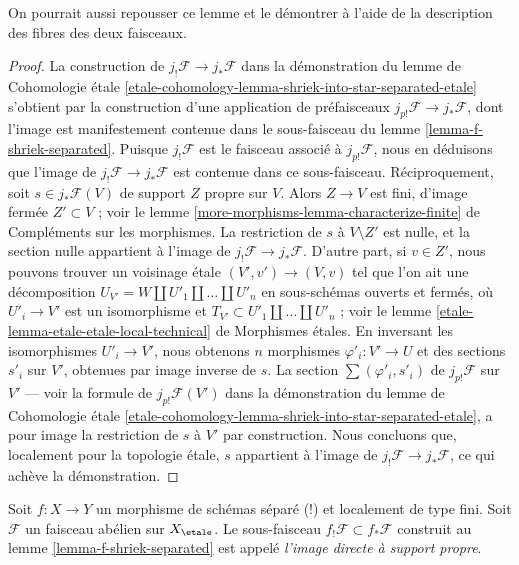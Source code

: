 \noindent
On pourrait aussi repousser ce lemme et le démontrer
à l'aide de la description des fibres des deux faisceaux.

\begin{proof}
La construction de $j_!\mathcal{F} \to j_*\mathcal{F}$ dans la démonstration du
lemme de Cohomologie étale
\ref{etale-cohomology-lemma-shriek-into-star-separated-etale}
s'obtient par la construction d'une application de préfaisceaux
$j_{p!}\mathcal{F} \to j_*\mathcal{F}$, dont l'image est manifestement
contenue dans le sous-faisceau du
lemme \ref{lemma-f-shriek-separated}.
Puisque $j_!\mathcal{F}$ est le faisceau associé à
$j_{p!}\mathcal{F}$, nous en déduisons que l'image de
$j_!\mathcal{F} \to j_*\mathcal{F}$ est contenue dans
ce sous-faisceau. Réciproquement, soit $s \in j_*\mathcal{F}(V)$
de support $Z$ propre sur $V$. Alors $Z \to V$ est
fini, d'image fermée $Z' \subset V$ ; voir le lemme
\ref{more-morphisms-lemma-characterize-finite} de Compléments sur les morphismes.
La restriction de $s$ à $V \setminus Z'$ est nulle, et la section nulle
appartient à l'image de $j_!\mathcal{F} \to j_*\mathcal{F}$.
D'autre part, si $v \in Z'$, nous pouvons trouver
un voisinage étale
$(V', v') \to (V, v)$ tel que l'on ait une décomposition
$U_{V'} = W \amalg U'_1 \amalg \ldots \amalg U'_n$
en sous-schémas ouverts et fermés, où $U'_i \to V'$ est un isomorphisme
et $T_{V'} \subset U'_1 \amalg \ldots \amalg U'_n$ ; voir le lemme
\ref{etale-lemma-etale-etale-local-technical} de Morphismes étales.
En inversant les isomorphismes $U'_i \to V'$,
nous obtenons $n$ morphismes $\varphi'_i : V' \to U$
et des sections $s'_i$ sur $V'$, obtenues par image inverse de $s$.
La section $\sum (\varphi'_i, s'_i)$ de
$j_{p!}\mathcal{F}$ sur $V'$ — voir la formule de $j_{p!}\mathcal{F}(V')$
dans la démonstration du lemme de Cohomologie étale
\ref{etale-cohomology-lemma-shriek-into-star-separated-etale},
a pour image la restriction de $s$ à $V'$ par construction.
Nous concluons que, localement pour la topologie étale, $s$ appartient à l'image
de $j_!\mathcal{F} \to j_*\mathcal{F}$, ce qui achève la démonstration.
\end{proof}

\begin{definition}
\label{definition-f-shriek-separated}
Soit $f : X \to Y$ un morphisme de schémas séparé (!) et
localement de type fini. Soit $\mathcal{F}$ un faisceau abélien sur
$X_\etale$. Le sous-faisceau $f_!\mathcal{F} \subset f_*\mathcal{F}$
construit au lemme \ref{lemma-f-shriek-separated} est appelé
{\it l'image directe à support propre}.
\end{definition}


